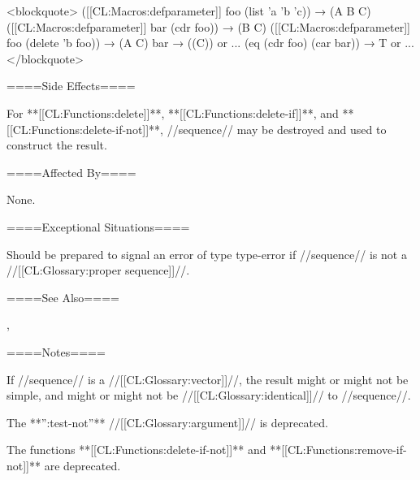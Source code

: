 <blockquote> ([[CL:Macros:defparameter]] foo (list 'a 'b 'c)) → (A B C) ([[CL:Macros:defparameter]] bar (cdr foo)) → (B C) ([[CL:Macros:defparameter]] foo (delete 'b foo)) → (A C) bar → ((C)) or ... (eq (cdr foo) (car bar)) → T or ... </blockquote>

====Side Effects====

For **[[CL:Functions:delete]]**, **[[CL:Functions:delete-if]]**, and **[[CL:Functions:delete-if-not]]**, //sequence// may be destroyed and used to construct the result.

====Affected By====

None.

====Exceptional Situations====

Should be prepared to signal an error of type type-error if //sequence// is not a //[[CL:Glossary:proper sequence]]//.

====See Also====

{\secref\ConstantModification},

{\secref\TraversalRules}

====Notes====

If //sequence// is a //[[CL:Glossary:vector]]//, the result might or might not be simple, and might or might not be //[[CL:Glossary:identical]]// to //sequence//.

The **'':test-not''** //[[CL:Glossary:argument]]// is deprecated.

The functions **[[CL:Functions:delete-if-not]]** and **[[CL:Functions:remove-if-not]]** are deprecated.

         
